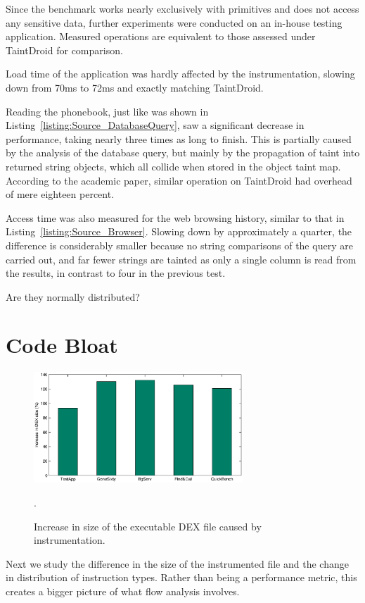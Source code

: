 \documentclass[12pt,twoside,notitlepage]{report}
\begin{document}
Since the benchmark works nearly exclusively with primitives and does not access any sensitive data, further experiments were conducted on an in-house testing application. Measured operations are equivalent to those assessed under TaintDroid for comparison. 

Load time of the application was hardly affected by the instrumentation, slowing down from 70ms to 72ms and exactly matching TaintDroid. 

Reading the phonebook, just like was shown in Listing~\ref{listing:Source_DatabaseQuery}, saw a significant decrease in performance, taking nearly three times as long to finish. This is partially caused by the analysis of the database query, but mainly by the propagation of taint into returned string objects, which all collide when stored in the object taint map. According to the academic paper, similar operation on TaintDroid had overhead of mere eighteen percent. 

Access time was also measured for the web browsing history, similar to that in Listing~\ref{listing:Source_Browser}. Slowing down by approximately a quarter, the difference is considerably smaller because no string comparisons of the query are carried out, and far fewer strings are tainted as only a single column is read from the results, in contrast to four in the previous test.

Are they normally distributed?

\section{Code Bloat}

\begin{figure}
	\centerline{
		\includegraphics[width=0.7\textwidth]{figs/fig_eval_filesize.eps}
	}
	\caption{Increase in size of the executable DEX file caused by instrumentation.}.
	\label{figure:Evalutaion_FileSize}
\end{figure}

Next we study the difference in the size of the instrumented file and the change in distribution of instruction types. Rather than being a performance metric, this creates a bigger picture of what flow analysis involves.
\end{document}
